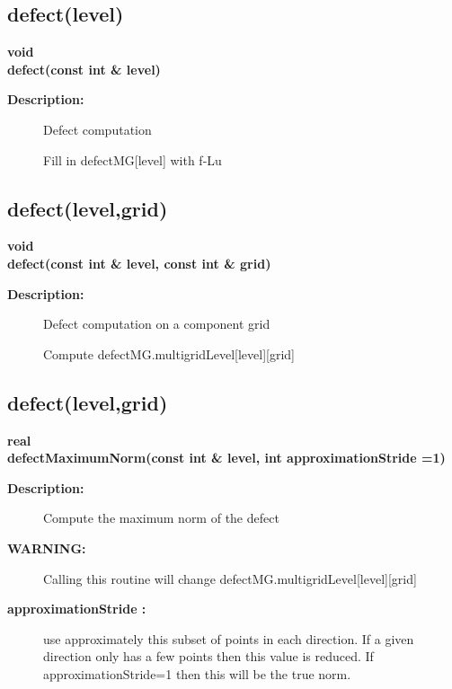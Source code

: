 \subsection{defect(level)}
 
\begin{flushleft} \textbf{%
void  \\ 
\settowidth{\OgmgIncludeArgIndent}{defect(}%
defect(const int \& level)
}\end{flushleft}
\begin{description}
\item[{\bf Description:}] 
    Defect computation 

   Fill in  defectMG[level] with f-Lu
\end{description}
\subsection{defect(level,grid)}
 
\begin{flushleft} \textbf{%
void  \\ 
\settowidth{\OgmgIncludeArgIndent}{defect(}%
defect(const int \& level, const int \& grid)
}\end{flushleft}
\begin{description}
\item[{\bf Description:}] 
    Defect computation on a component grid

    Compute defectMG.multigridLevel[level][grid]
\end{description}
\subsection{defect(level,grid)}
 
\begin{flushleft} \textbf{%
real  \\ 
\settowidth{\OgmgIncludeArgIndent}{defectMaximumNorm(}%
defectMaximumNorm(const int \& level, int approximationStride  =1)
}\end{flushleft}
\begin{description}
\item[{\bf Description:}] 
    Compute the maximum norm of the defect 

\item[{\bf WARNING:}]  Calling this routine will change defectMG.multigridLevel[level][grid]

\item[{\bf approximationStride :}]  use approximately this subset of points in each direction. If a given
    direction only has a few points then this value is reduced. If approximationStride=1 then
    this will be the true norm.

\end{description}

